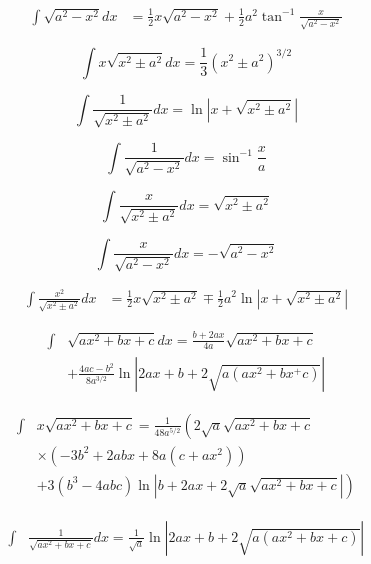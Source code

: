 \documentclass[11pt,twoside]{article}
\begin{document}
\begin{multicols}{3}
\begin{footnotesize}
\begin{align}
\int  \sqrt{a^2 - x^2} dx &= \frac{1}{2} x \sqrt{a^2-x^2}
+\frac{1}{2}a^2\tan^{-1}\frac{x}{\sqrt{a^2-x^2}}
\end{align}

\begin{equation}
\int  x \sqrt{x^2 \pm a^2} dx= \frac{1}{3}\left ( x^2 \pm a^2 \right)^{3/2}
\end{equation}

\begin{equation}
\int \frac{1}{\sqrt{x^2 \pm a^2}} dx = \ln \left | x + \sqrt{x^2 \pm a^2} \right |
\end{equation}

\begin{equation}
\int \frac{1}{\sqrt{a^2 - x^2}} dx = \sin^{-1}\frac{x}{a}
\end{equation}

\begin{equation}
\int \frac{x}{\sqrt{x^2\pm a^2}}dx = \sqrt{x^2 \pm a^2}
\end{equation}

\begin{equation}
\int \frac{x}{\sqrt{a^2-x^2}}dx = -\sqrt{a^2-x^2}
\end{equation}

\begin{align}
\int \frac{x^2}{\sqrt{x^2 \pm a^2}} dx &= \frac{1}{2}x\sqrt{x^2 \pm a^2}
\mp \frac{1}{2}a^2 \ln \left| x + \sqrt{x^2\pm a^2} \right |
\end{align}

\begin{align}
\int &\sqrt{a x^2 + b x + c} dx =
\frac{b+2ax}{4a}\sqrt{ax^2+bx+c}
\nonumber \\ &
+
\frac{4ac-b^2}{8a^{3/2}}\ln \left| 2ax + b + 2\sqrt{a(ax^2+bx^+c)}\right |
\end{align}

\begin{align}
\int &x \sqrt{a x^2 + bx + c} = \frac{1}{48a^{5/2}}\left (
2 \sqrt{a} \sqrt{ax^2+bx+c}
\right . \nonumber \\ &
 \times \left( -3b^2 + 2 abx + 8 a(c+ax^2) \right)
 \nonumber \\ & \left.
 + 3(b^3-4abc)\ln \left|b + 2ax + 2\sqrt{a}\sqrt{ax^2+bx+c} \right| \right)
\end{align}

\begin{align}
\int&\frac{1}{\sqrt{ax^2+bx+c}}dx=
\frac{1}{\sqrt{a}}\ln \left| 2ax+b + 2 \sqrt{a(ax^2+bx+c)} \right |
\end{align}


\end{footnotesize}
\end{multicols}
\end{document}

